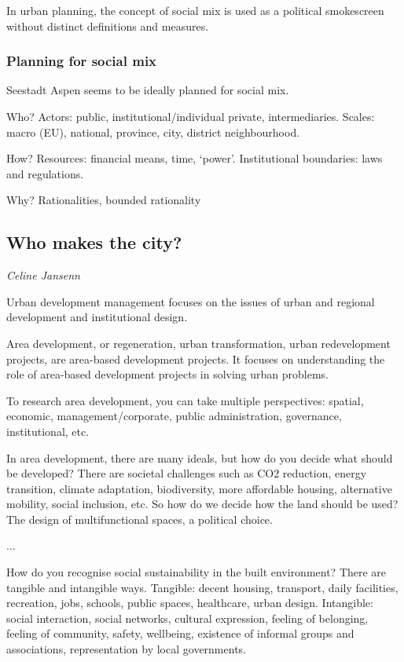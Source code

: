 \documentclass{article}
\begin{document}
In urban planning, the concept of social mix is used as a political smokescreen without distinct definitions and measures. 

\subsubsection{Planning for social mix }

Seestadt Aspen seems to be ideally planned for social mix.

Who? Actors: public, institutional/individual private, intermediaries. Scales: macro (EU), national, province, city, district neighbourhood.

How? Resources: financial means, time, `power'. Institutional boundaries: laws and regulations.

Why? Rationalities, bounded rationality

\subsection{Who makes the city?}

\textit{Celine Jansenn}

Urban development management focuses on the issues of urban and regional development and institutional design. 

Area development, or regeneration, urban transformation, urban redevelopment projects, are area-based development projects. It focuses on understanding the role of area-based development projects in solving urban problems. 

To research area development, you can take multiple perspectives: spatial, economic, management/corporate, public administration, governance, institutional, etc.

In area development, there are many ideals, but how do you decide what should be developed? There are societal challenges such as CO2 reduction, energy transition, climate adaptation, biodiversity, more affordable housing, alternative mobility, social inclusion, etc. So how do we decide how the land should be used? The design of multifunctional spaces, a political choice.

...

How do you recognise social sustainability in the built environment? There are tangible and intangible ways. Tangible: decent housing, transport, daily facilities, recreation, jobs, schools, public spaces, healthcare, urban design. Intangible: social interaction, social networks, cultural expression, feeling of belonging, feeling of community, safety, wellbeing, existence of informal groups and associations, representation by local governments.
\end{document}
